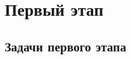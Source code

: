\documentclass[a4paper,12pt,oneside]{book}
\begin{document}

\setcounter{tocdepth}{1}

\tableofcontents

\part{Первый этап}

\chapter{Задачи первого этапа}

\end{document}
